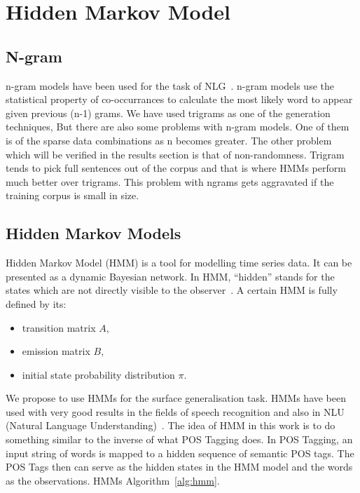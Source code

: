 \documentclass[a4paper,12pt]{article}
\begin{document}
\section{Hidden Markov Model}
\label{sec:method}

\subsection{N-gram}
n-gram models have been used for the task of NLG~\cite{nlgngram}. n-gram models use the
statistical property of co-occurrances to calculate the most likely word to
appear given previous (n-1) grams. We have used trigrams as one of the generation techniques,
But there are  also some problems with n-gram models. One of them 
is of the sparse data combinations as n becomes greater. The other problem which will be 
verified in the results section is that of non-randomness. Trigram tends to 
pick full sentences out of the corpus and that is where HMMs perform much
better over trigrams. This problem with ngrams gets aggravated if the training
corpus is small in size. 


\subsection{Hidden Markov Models}
Hidden Markov Model (HMM) is a tool for modelling time series data.
It can be presented as a dynamic Bayesian network. In HMM, ``hidden''
stands for the states which are not directly visible to the observer~\cite{hmm}.
A certain HMM is fully defined by its:
\begin{itemize}
  \item transition matrix $A$,
  \item emission matrix $B$,
  \item initial state probability distribution $\pi$.
\end{itemize}

We propose to use HMMs for the surface generalisation task. HMMs have been used
with very good results in the fields of speech recognition and also in NLU
(Natural Language Understanding)~\cite{hmmsr}. The idea of HMM in this work is
to do something similar to the inverse of what POS Tagging does. In POS
Tagging, an input string of words is mapped to a hidden sequence of semantic POS
tags. The POS Tags then can serve as the hidden states in the HMM model and the
words as the observations. HMMs 
Algorithm~\ref{alg:hmm}.
\end{document}
